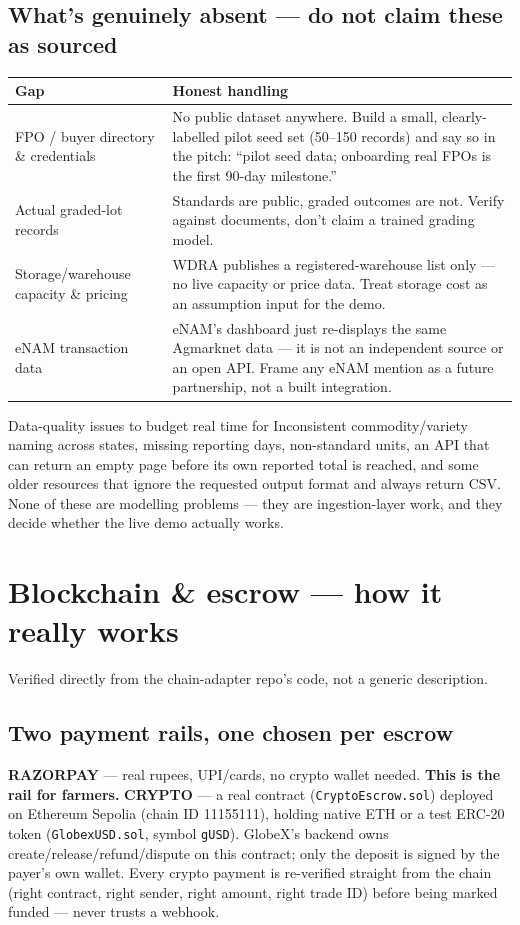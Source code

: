 \documentclass[11pt]{article}
\begin{document}
\subsection*{What's genuinely absent --- do not claim these as sourced}
\renewcommand{\arraystretch}{1.3}
\noindent\begin{longtable}{@{}p{4.3cm}p{8.5cm}@{}}
\toprule
\textbf{Gap} & \textbf{Honest handling} \\
\midrule
\endhead
FPO / buyer directory \& credentials & No public dataset anywhere. Build a small, clearly-labelled pilot
seed set (50--150 records) and say so in the pitch: ``pilot seed data; onboarding real FPOs is the first
90-day milestone.'' \\[0.3em]
Actual graded-lot records & Standards are public, graded outcomes are not. Verify against documents, don't
claim a trained grading model. \\[0.3em]
Storage/warehouse capacity \& pricing & WDRA publishes a registered-warehouse list only --- no live capacity
or price data. Treat storage cost as an assumption input for the demo. \\[0.3em]
eNAM transaction data & eNAM's dashboard just re-displays the same Agmarknet data --- it is not an
independent source or an open API. Frame any eNAM mention as a future partnership, not a built integration. \\
\bottomrule
\end{longtable}

\begin{warnbox}{Data-quality issues to budget real time for}
Inconsistent commodity/variety naming across states, missing reporting days, non-standard units, an API
that can return an empty page before its own reported total is reached, and some older resources that
ignore the requested output format and always return CSV. None of these are modelling problems --- they are
ingestion-layer work, and they decide whether the live demo actually works.
\end{warnbox}

\clearpage
\section{Blockchain \& escrow --- how it really works}
Verified directly from the chain-adapter repo's code, not a generic description.

\subsection*{Two payment rails, one chosen per escrow}
\textbf{RAZORPAY} --- real rupees, UPI/cards, no crypto wallet needed. \textbf{This is the rail for
farmers.} \textbf{CRYPTO} --- a real contract (\texttt{CryptoEscrow.sol}) deployed on Ethereum Sepolia
(chain ID 11155111), holding native ETH or a test ERC-20 token (\texttt{GlobexUSD.sol}, symbol
\texttt{gUSD}). GlobeX's backend owns create/release/refund/dispute on this contract; only the deposit is
signed by the payer's own wallet. Every crypto payment is re-verified straight from the chain (right
contract, right sender, right amount, right trade ID) before being marked funded --- never trusts a webhook.
\end{document}
